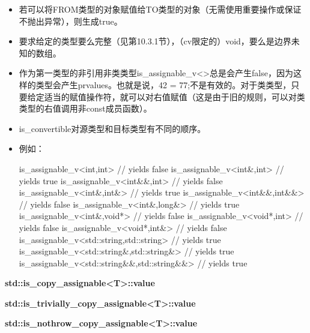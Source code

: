 \begin{itemize}
\item
若可以将FROM类型的对象赋值给TO类型的对象（无需使用重要操作或保证不抛出异常），则生成true。

\item
要求给定的类型要么完整（见第10.3.1节），（cv限定的）void，要么是边界未知的数组。

\item
作为第一类型的非引用非类类型is\_assignable\_v<>总是会产生false，因为这样的类型会产生prvalues。也就是说，42 = 77;不是有效的。对于类类型，只要给定适当的赋值操作符，就可以对右值赋值（这是由于旧的规则，可以对类类型的右值调用非const成员函数）。

\item
is\_convertible对源类型和目标类型有不同的顺序。

\item
例如：
\begin{cpp}
is_assignable_v<int,int> // yields false
is_assignable_v<int&,int> // yields true
is_assignable_v<int&&,int> // yields false
is_assignable_v<int&,int&> // yields true
is_assignable_v<int&&,int&&> // yields false
is_assignable_v<int&,long&> // yields true
is_assignable_v<int&,void*> // yields false
is_assignable_v<void*,int> // yields false
is_assignable_v<void*,int&> // yields false
is_assignable_v<std::string,std::string> // yields true
is_assignable_v<std::string&,std::string&> // yields true
is_assignable_v<std::string&&,std::string&&> // yields true
\end{cpp}
\end{itemize}

\textbf{std::is\_copy\_assignable<T>::value}

\textbf{std::is\_trivially\_copy\_assignable<T>::value}

\textbf{std::is\_nothrow\_copy\_assignable<T>::value}

